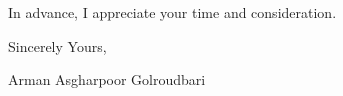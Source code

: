 \documentclass[a4,25pt]{article}
\begin{document}
\begin{large}
In advance, I appreciate your time and consideration. \par
\vspace{-0.4cm} Sincerely Yours, \par
\vspace{-0.4cm}Arman Asgharpoor Golroudbari \par

\end{large}

\small

\end{document}
